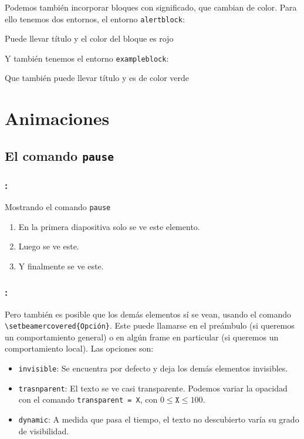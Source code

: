 \documentclass[11pt]{beamer}	%
\begin{document}
\begin{frame}
	\frametitle{\secname}
	
	Podemos también incorporar bloques con significado, que cambian de color. Para ello tenemos dos entornos, el entorno \texttt{alertblock}:
		\begin{alertblock}{Puede llevar título}
			y el color del bloque es rojo
		\end{alertblock}
	
	Y también tenemos el entorno \texttt{exampleblock}:
		\begin{exampleblock}{Que también puede llevar título}
			y es de color verde
		\end{exampleblock}
\end{frame}

\section{Animaciones}
\subsection{El comando \texttt{pause}}
\begin{frame}
	\frametitle{\secname : \subsecname}
	
	\begin{block}{Mostrando el comando \texttt{pause}}
	\begin{enumerate}
		\item En la primera diapositiva solo se ve este elemento.	\pause
		\item Luego se ve este.							\pause
		\item Y finalmente se ve este.						
	\end{enumerate}
	\end{block}
\end{frame}

\begin{frame}
	\frametitle{\secname: \subsecname}
		
	Pero también es posible que los demás elementos \alert{sí} se vean, usando el comando \texttt{\textbackslash setbeamercovered\{Opción\}}. Este puede llamarse en el preámbulo (si queremos un comportamiento general) o en algún frame en particular (si queremos un comportamiento local). Las opciones son:
		\begin{itemize}
			\item \texttt{invisible}: Se encuentra por defecto y deja los demás elementos invisibles.
			\item \texttt{trasnparent}: El texto se ve casi transparente. Podemos variar la opacidad con el comando \texttt{transparent = X}, con $0 \leq \texttt{X} \leq 100$.
			\item \texttt{dynamic}: A medida que pasa el tiempo, el texto no descubierto varía su grado de visibilidad.		
		\end{itemize}
\end{frame}
\end{document}
